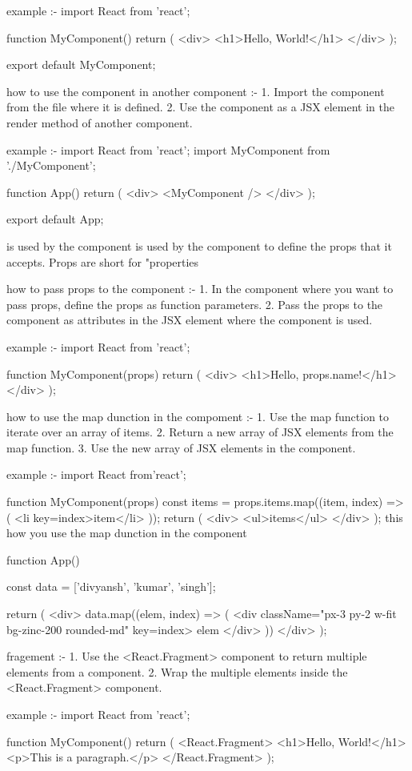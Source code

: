 example :-
import React from 'react';

function MyComponent() {
  return (
    <div>
      <h1>Hello, World!</h1>
    </div>
  );
}

export default MyComponent;

how to use the component in another component :-
1. Import the component from the file where it is defined.
2. Use the component as a JSX element in the render method of another component.

example :-
import React from 'react';
import MyComponent from './MyComponent';

function App() {
  return (
    <div>
      <MyComponent />
    </div>
    );
}

export default App;

{} is used by the component
{} is used by the component to define the props that it accepts. Props are short for "properties

how to pass props to the component :-
1. In the component where you want to pass props, define the props as function parameters.
2. Pass the props to the component as attributes in the JSX element where the component is used.

example :-
import React from 'react';

function MyComponent(props) {
  return (
    <div>
      <h1>Hello, {props.name}!</h1>
    </div>
  );
}

how to use the map dunction in the compoment :-
1. Use the map function to iterate over an array of items.
2. Return a new array of JSX elements from the map function.
3. Use the new array of JSX elements in the component.

example :-
import React from'react';

function MyComponent(props) {
  const items = props.items.map((item, index) => (
    <li key={index}>{item}</li>
  ));
  return (
    <div>
      <ul>{items}</ul>
    </div>
  );
}
this how you use the map dunction in the component 


function App() {
  const data = ['divyansh', 'kumar', 'singh'];
  
  return (
    <div>
      {data.map((elem, index) => (
        <div className="px-3 py-2 w-fit bg-zinc-200 rounded-md" key={index}>
          {elem}
        </div>
      ))}
    </div>
  );
}

fragement :- 
1. Use the <React.Fragment> component to return multiple elements from a component.
2. Wrap the multiple elements inside the <React.Fragment> component.

example :-
import React from 'react';

function MyComponent() {
  return (
    <React.Fragment>
      <h1>Hello, World!</h1>
      <p>This is a paragraph.</p>
    </React.Fragment>
  );
}